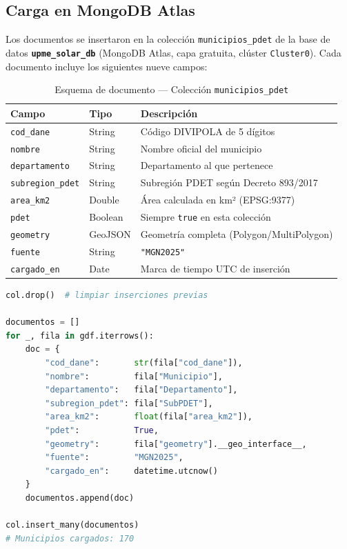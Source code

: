 \documentclass[12pt, a4paper]{report}
\begin{document}
\subsection{Carga en MongoDB Atlas}

Los documentos se insertaron en la colección \texttt{municipios\_pdet}
de la base de datos \textbf{\texttt{upme\_solar\_db}} (MongoDB Atlas, capa
gratuita, clúster \texttt{Cluster0}). Cada documento incluye los siguientes
nueve campos:

\begin{table}[H]
  \centering
  \caption{Esquema de documento — Colección \texttt{municipios\_pdet}}
  \label{tab:esquema_municipios}
  \begin{tabularx}{\textwidth}{llX}
    \toprule
    \textbf{Campo} & \textbf{Tipo} & \textbf{Descripción} \\
    \midrule
    \texttt{cod\_dane}       & String  & Código DIVIPOLA de 5 dígitos \\
    \texttt{nombre}          & String  & Nombre oficial del municipio \\
    \texttt{departamento}    & String  & Departamento al que pertenece \\
    \texttt{subregion\_pdet} & String  & Subregión PDET según Decreto 893/2017 \\
    \texttt{area\_km2}       & Double  & Área calculada en km² (EPSG:9377) \\
    \texttt{pdet}            & Boolean & Siempre \texttt{true} en esta colección \\
    \texttt{geometry}        & GeoJSON & Geometría completa (Polygon/MultiPolygon) \\
    \texttt{fuente}          & String  & \texttt{"MGN2025"} \\
    \texttt{cargado\_en}     & Date    & Marca de tiempo UTC de inserción \\
    \bottomrule
  \end{tabularx}
\end{table}

\begin{lstlisting}[language=Python,
  caption={Carga de documentos en MongoDB Atlas}]
col.drop()  # limpiar inserciones previas

documentos = []
for _, fila in gdf.iterrows():
    doc = {
        "cod_dane":       str(fila["cod_dane"]),
        "nombre":         fila["Municipio"],
        "departamento":   fila["Departamento"],
        "subregion_pdet": fila["SubPDET"],
        "area_km2":       float(fila["area_km2"]),
        "pdet":           True,
        "geometry":       fila["geometry"].__geo_interface__,
        "fuente":         "MGN2025",
        "cargado_en":     datetime.utcnow()
    }
    documentos.append(doc)

col.insert_many(documentos)
# Municipios cargados: 170
\end{lstlisting}
\end{document}
